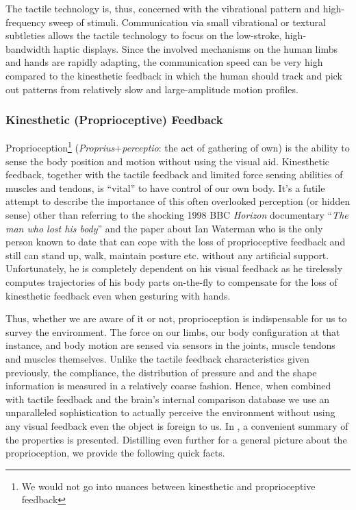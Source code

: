 The tactile technology is, thus, concerned with the vibrational pattern and high-frequency sweep of stimuli. Communication via small vibrational or textural subtleties allows the tactile technology to focus on the low-stroke, high-bandwidth haptic displays. Since the involved mechanisms on the human limbs and hands are rapidly adapting, the communication speed can be very high compared to the kinesthetic feedback in which the human should track and pick out patterns from relatively slow and large-amplitude motion profiles. 


\subsubsection{Kinesthetic (Proprioceptive) Feedback}
Proprioception\footnote{We would not go into nuances between kinesthetic and proprioceptive feedback} (\emph{Proprius}+\emph{perceptio}: the act of gathering of own) is the ability to sense the body position and motion without using the visual aid. Kinesthetic feedback, together with the tactile feedback and limited force sensing abilities of muscles and tendons, is \enquote{vital} to have control of our own body. It's a futile attempt to describe the importance of this often overlooked perception (or hidden sense) other than referring to the shocking 1998 BBC \emph{Horizon} documentary \enquote{\emph{The man who lost his body}} and the paper \cite{waterman} about Ian Waterman who is the only person known to date that can cope with the loss of proprioceptive feedback and still can stand up, walk, maintain posture etc. without any artificial support. Unfortunately, he is completely dependent on his visual feedback as he tirelessly computes trajectories of his body parts on-the-fly to compensate for the loss of kinesthetic feedback even when gesturing with hands. 

Thus, whether we are aware of it or not, proprioception is indispensable for us to survey the environment. The force on our limbs, our body configuration at that instance, and body motion are sensed via sensors in the joints, muscle tendons and muscles themselves. Unlike the tactile feedback characteristics given previously, the compliance, the distribution of pressure and and the shape information is measured in a relatively coarse fashion. Hence, when combined with tactile feedback and the brain's internal comparison database we use an unparalleled sophistication to actually perceive the environment without using any visual feedback even the object is foreign to us. In \cite{biggssrinivasan}, a convenient summary of the properties is presented. Distilling even further for a general picture about the proprioception, we provide the following quick facts. 

